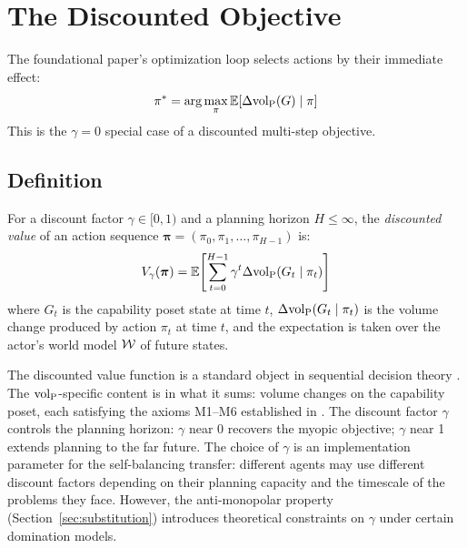 \section{The Discounted Objective}
\label{sec:discounted}

The foundational paper's optimization loop selects actions by their immediate
effect:
\begin{equation}
\label{eq:myopic}
\pi^* = \arg\max_\pi \mathbb{E}[\Delta {\operatorname{vol}_{\mathrm{P}}}(G) \mid \pi]
\end{equation}
This is the $\gamma = 0$ special case of a discounted multi-step objective.

\subsection{Definition}

\begin{definition}
\label{def:discounted}
For a discount factor $\gamma \in [0, 1)$ and a planning horizon $H \leq
    \infty$, the \emph{discounted value} of an action sequence
    $\boldsymbol{\pi} = (\pi_0, \pi_1, \ldots, \pi_{H-1})$ is:
\begin{equation}
\label{eq:discounted}
V_\gamma(\boldsymbol{\pi}) = \mathbb{E}\!\left[\sum_{t=0}^{H-1} \gamma^t
    \Delta {\operatorname{vol}_{\mathrm{P}}}(G_t \mid \pi_t)\right]
\end{equation}
where $G_t$ is the capability poset state at time $t$, $\Delta {\operatorname{vol}_{\mathrm{P}}}(G_t
    \mid \pi_t)$ is the volume change produced by action $\pi_t$ at time $t$,
    and the expectation is taken over the actor's world model
    $\mathcal{W}$ of future states.
\end{definition}

The discounted value function is a standard object in sequential decision
theory \citep{puterman1994markov, sutton2018reinforcement}. The
${\operatorname{vol}_{\mathrm{P}}}$-specific content is in what it sums: volume changes on the capability
poset, each satisfying the axioms M1--M6 established in
\citet{lasser2026poset}. The discount factor $\gamma$ controls the planning
horizon: $\gamma$ near 0 recovers the myopic objective; $\gamma$ near 1
extends planning to the far future. The choice of $\gamma$ is an
implementation parameter for the self-balancing transfer: different agents
may use different discount factors depending on their planning capacity and
the timescale of the problems they face. However, the anti-monopolar
property (Section~\ref{sec:substitution}) introduces theoretical constraints
on $\gamma$ under certain domination models.

